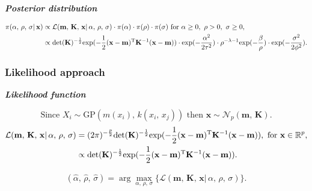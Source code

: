 \documentclass[a4paper, 10pt, fleqn]{article}
\begin{document}
\begin{flushleft}
            \textbf{\textit{Posterior distribution}}
            
            \begin{align*}
               \pi(\alpha,\, \rho,\, \sigma| \, \mathbf{x}) 
               & \propto \mathcal{L}(\mathbf{m},\, \mathbf{K},\, \mathbf{x}| \, \alpha,\, \rho,\, \sigma) 
               \cdot \pi(\alpha) 
               \cdot \pi(\rho) 
               \cdot \pi(\sigma)
               \text{ for } \alpha \geq 0,\ \rho > 0,\ \sigma \geq 0,\\
               & \propto \text{det}(\mathbf{K})^{-\frac{1}{2}} 
               \text{exp} (-\frac{1}{2} (\mathbf{x} - \mathbf{m})^{\text{\text{T}}} \mathbf{K}^{-1} (\mathbf{x} - \mathbf{m}))
               \cdot \text{exp}(-\frac{\alpha^2}{2\tau^2}) 
               \cdot \rho^{-\lambda-1} \text{exp}(-\frac{\beta}{\rho}) 
               \cdot \text{exp}(-\frac{\sigma^2}{2\phi^2}).
            \end{align*}

      \subsubsection*{Likelihood approach}
      
         \textbf{\textit{Likelihood function}}

            \[\text{Since } X_{i} \sim \text{GP}(m(x_{i}) ,\, k(x_{i},\, x_{j})) \text{ then } \mathbf{x} \sim \mathcal{N}_{p}(\mathbf{m} ,\, \mathbf{K}).\]
            \begin{align*}
               \mathcal{L}(\mathbf{m} ,\, \mathbf{K} ,\, \mathbf{x}| \, \alpha ,\, \rho ,\, \sigma)
               & = (2\pi)^{-\frac{p}{2}}\text{det}(\mathbf{K})^{-\frac{1}{2}} 
               \text{exp} (-\frac{1}{2} (\mathbf{x} - \mathbf{m})^{\text{\text{T}}} \mathbf{K}^{-1} (\mathbf{x} - \mathbf{m})),
               \text{ for } \mathbf{x} \in \mathbb{R}^{p},\\
               & \propto \text{det}(\mathbf{K})^{-\frac{1}{2}} 
               \text{exp} (-\frac{1}{2} (\mathbf{x} - \mathbf{m})^{\text{\text{T}}} \mathbf{K}^{-1} (\mathbf{x} - \mathbf{m})).
            \end{align*}

            \begin{align*}
               (\hat{\alpha} ,\, \hat{\rho} ,\, \hat{\sigma}) = \arg\max_{\alpha ,\, \rho ,\, \sigma} \{\mathcal{L}(\mathbf{m} ,\, \mathbf{K} ,\, \mathbf{x}| \, \alpha ,\, \rho ,\, \sigma)\}.
            \end{align*}


\end{flushleft}
\end{document}
